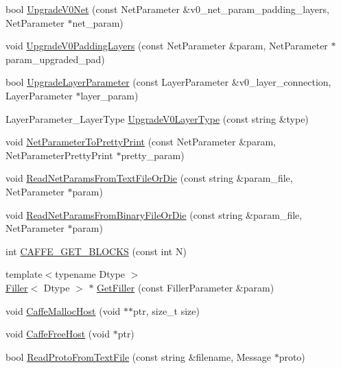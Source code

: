 \begin{DoxyCompactItemize}
\item 
bool \hyperlink{namespacecaffe_a6b649169cf6f1639f5051e3e559985fd}{Upgrade\+V0\+Net} (const Net\+Parameter \&v0\+\_\+net\+\_\+param\+\_\+padding\+\_\+layers, Net\+Parameter $\ast$net\+\_\+param)
\item 
void \hyperlink{namespacecaffe_a772706c501bd181224155eeeb6cc9c04}{Upgrade\+V0\+Padding\+Layers} (const Net\+Parameter \&param, Net\+Parameter $\ast$param\+\_\+upgraded\+\_\+pad)
\item 
bool \hyperlink{namespacecaffe_ac9be5114eb970d9d6525516aecfbc5b6}{Upgrade\+Layer\+Parameter} (const Layer\+Parameter \&v0\+\_\+layer\+\_\+connection, Layer\+Parameter $\ast$layer\+\_\+param)
\item 
Layer\+Parameter\+\_\+\+Layer\+Type \hyperlink{namespacecaffe_a8fcad9c4e53394efe40b403eb0b7006b}{Upgrade\+V0\+Layer\+Type} (const string \&type)
\item 
void \hyperlink{namespacecaffe_acc4eafb4ddd81481b7e8a96c90d1fc0c}{Net\+Parameter\+To\+Pretty\+Print} (const Net\+Parameter \&param, Net\+Parameter\+Pretty\+Print $\ast$pretty\+\_\+param)
\item 
void \hyperlink{namespacecaffe_a8801bcd5125b2aec799adcc7f617be1a}{Read\+Net\+Params\+From\+Text\+File\+Or\+Die} (const string \&param\+\_\+file, Net\+Parameter $\ast$param)
\item 
void \hyperlink{namespacecaffe_aec4379a5d972592245df191bec9c75bd}{Read\+Net\+Params\+From\+Binary\+File\+Or\+Die} (const string \&param\+\_\+file, Net\+Parameter $\ast$param)
\item 
int \hyperlink{namespacecaffe_a8e21af5757c4326c467f2aafac590350}{C\+A\+F\+F\+E\+\_\+\+G\+E\+T\+\_\+\+B\+L\+O\+C\+K\+S} (const int N)
\item 
{\footnotesize template$<$typename Dtype $>$ }\\\hyperlink{classcaffe_1_1_filler}{Filler}$<$ Dtype $>$ $\ast$ \hyperlink{namespacecaffe_a819e1b2fe30b54d6df0fd88e646ec126}{Get\+Filler} (const Filler\+Parameter \&param)
\item 
void \hyperlink{namespacecaffe_a4f2ffa496ad8c552560065585b326095}{Caffe\+Malloc\+Host} (void $\ast$$\ast$ptr, size\+\_\+t size)
\item 
void \hyperlink{namespacecaffe_ae9a6e69c0c49a355cf94964fa93ff990}{Caffe\+Free\+Host} (void $\ast$ptr)
\item 
bool \hyperlink{namespacecaffe_a8e9cbf61e86c52f68a7adefe8d5380e7}{Read\+Proto\+From\+Text\+File} (const string \&filename, Message $\ast$proto)
\item 
$$
\end{DoxyCompactItemize}
